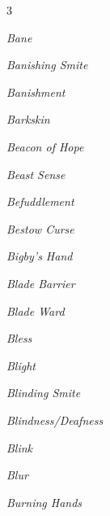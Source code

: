 \documentclass[10pt,a4paper,twoside,bg=print,twocolumn,openany,nodeprecatedcode]{dndbook}
\begin{document}
\begin{description}
\begin{multicols}{3}
\item \textit{Bane}
\item \textit{Banishing Smite}
\item \textit{Banishment}
\item \textit{Barkskin}
\item \textit{Beacon of Hope}
\item \textit{Beast Sense}
\item \textit{Befuddlement}
\item \textit{Bestow Curse}
\item \textit{Bigby's Hand}
\item \textit{Blade Barrier}
\item \textit{Blade Ward}
\item \textit{Bless}
\item \textit{Blight}
\item \textit{Blinding Smite}
\item \textit{Blindness/Deafness}
\item \textit{Blink}
\item \textit{Blur}
\item \textit{Burning Hands}
\end{multicols}

\end{description}
\end{document}
